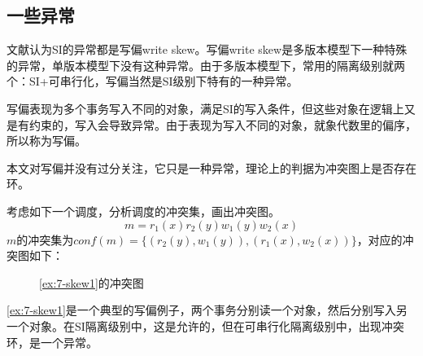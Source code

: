\subsection{一些异常}

文献\cite{fekete2005making}认为SI的异常都是写偏write skew。写偏write skew是多版本模型下一种特殊的异常，单版本模型下没有这种异常。由于多版本模型下，常用的隔离级别就两个：SI+可串行化，写偏当然是SI级别下特有的一种异常。

写偏表现为多个事务写入不同的对象，满足SI的写入条件，但这些对象在逻辑上又是有约束的，写入会导致异常。由于表现为写入不同的对象，就象代数里的偏序，所以称为写偏。

本文对写偏并没有过分关注，它只是一种异常，理论上的判据为冲突图上是否存在环。

\begin{example}\label{ex:7-skew1}
    考虑如下一个调度，分析调度的冲突集，画出冲突图。
$$
m = r_1(x)r_2(y)w_1(y)w_2(x)
$$
$m$的冲突集为$conf(m)= \{ (r_2(y),w_1(y)),(r_1(x),w_2(x)) \}$，对应的冲突图如下：
\begin{figure}[H]
    \centering
    \caption{\examplename\ref{ex:7-skew1}的冲突图}
    \label{fig:7-skew1}
\end{figure}
\end{example}

\examplename\ref{ex:7-skew1}是一个典型的写偏例子，两个事务分别读一个对象，然后分别写入另一个对象。在SI隔离级别中，这是允许的，但在可串行化隔离级别中，出现冲突环，是一个异常。

